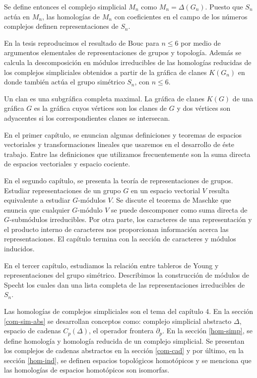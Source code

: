 \documentclass[12pt]{book}
\theoremstyle{definition}
\newcounter{in}
\newcounter{ini}
\begin{document}
Se define entonces el complejo simplicial $M_{n}$ como
$M_{n}=\Delta(G_{n})$. Puesto que $S_{n}$ actúa en $M_{n}$, las
homologías de $M_{n}$ con coeficientes en el campo de los
números complejos definen representaciones de $S_{n}$.

En la tesis reproducimos el resultado de Bouc para $n\leq 6$ por medio de
argumentos elementales de representaciones de grupos y
topología. Además se calcula la descomposición en módulos irreducibles de las homologías
reducidas de los complejos simpliciales obtenidos a partir de la
gráfica de clanes $K(G_{n})$ en donde también actúa el grupo simétrico
$S_{n}$, con $n\leq 6$.

Un clan es una subgráfica completa maximal. La gráfica de clanes
$K(G)$ de una gráfica $G$ es la gráfica cuyos vértices son los clanes
de $G$ y dos vértices son adyacentes si los correspondientes clanes se
intersecan.

En el primer capítulo, se enuncian algunas definiciones y teoremas
de espacios vectoriales y transformaciones lineales que usaremos en el
desarrollo de éste trabajo. Entre las definiciones que utilizamos
frecuentemente son la suma directa de espacios vectoriales y
espacio cociente. 

En el segundo capítulo, se presenta la teoría de representaciones de
grupos. Estudiar representaciones de un grupo $G$ en un espacio
vectorial $V$ resulta equivalente a estudiar $G$-módulos $V$. Se
discute el teorema de Maschke que enuncia que cualquier $G$-módulo $V$
se puede descomponer como suma directa de $G$-submódulos
irreducibles. Por otra parte, los caracteres de una
representación y el producto interno de caracteres nos proporcionan información
acerca las representaciones. El capítulo termina con la sección de
caracteres y módulos inducidos.

En el tercer capítulo, estudiamos la relación entre tableros de Young
y representaciones del grupo simétrico. Describimos la construcción de
módulos de Specht los cuales dan una lista completa de las representaciones irreducibles de
$S_{n}$.

Las homologías de complejos simpliciales son el tema del capítulo 4.
En la sección \ref{com-sim-abs} se desarrollan conceptos como:
complejo simplicial abstracto $\Delta$, espacio de cadenas $C_{p}(\Delta)$, el
operador frontera $\partial_{p}$. En la sección \ref{hom-simp}, se
define homología  y homología reducida de un complejo simplicial. Se
presentan los complejos de cadenas abstractos en la sección \ref{com-cad} y por
último, en la sección \ref{hom-ind}, se definen espacios topológicos
homotópicos y se menciona que las homologías de espacios homotópicos son
isomorfas.
\end{document}
